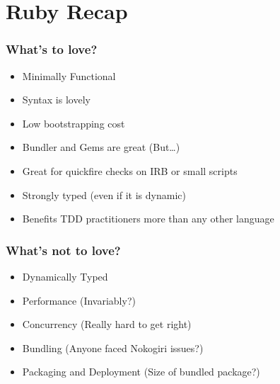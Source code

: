 \section{Ruby Recap}
\label{sec:ruby-recap}

\begin{frame}
  \frametitle{What's to love?}
  \begin{itemize}
  \item Minimally Functional
  \item Syntax is lovely
  \item Low bootstrapping cost
  \item Bundler and Gems are great (But\ldots)
  \item Great for quickfire checks on IRB or small scripts
  \item Strongly typed (even if it is dynamic)
  \item Benefits TDD practitioners more than any other language
  \end{itemize}
\end{frame}

\begin{frame}
  \frametitle{What's not to love?}
  \begin{itemize}
  \item Dynamically Typed
  \item Performance (Invariably?)
  \item Concurrency (Really hard to get right)
  \item Bundling (Anyone faced Nokogiri issues?)
  \item Packaging and Deployment (Size of bundled package?)
  \end{itemize}
\end{frame}
